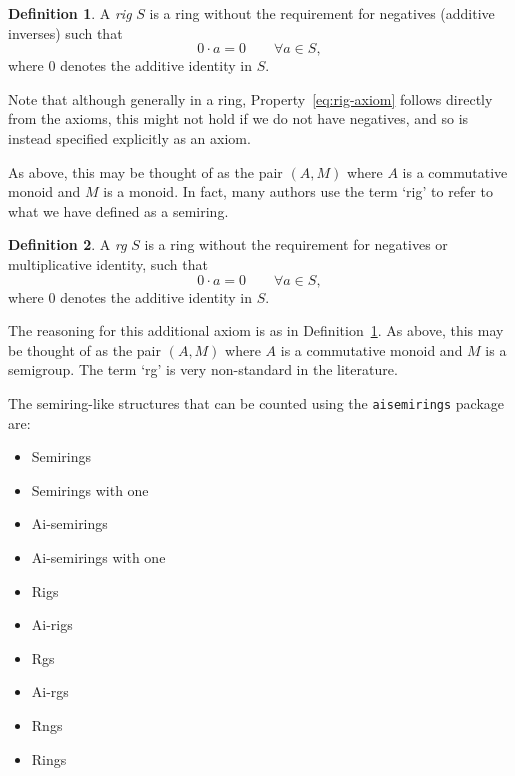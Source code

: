 \documentclass{article}
\theoremstyle{definition}
\newtheorem{definition}{Definition}
\begin{document}
\begin{definition}
    \label{def:rig}
    A \emph{rig} \(S\) is a ring without the requirement for negatives (additive inverses) such that
    \begin{equation}
        \label{eq:rig-axiom}
        0\cdot a=0\qquad\forall a\in S,
    \end{equation}
    where \(0\) denotes the additive identity in \(S\).
    
    Note that although generally in a ring, Property~\eqref{eq:rig-axiom} follows directly from the axioms, this might not hold if we do not have negatives, and so is instead specified explicitly as an axiom.

    As above, this may be thought of as the pair \((A, M)\) where \(A\) is a commutative monoid and \(M\) is a monoid. In fact, many authors use the term `rig' to refer to what we have defined as a semiring.

\end{definition}
\begin{definition}
    A \emph{rg} \(S\) is a ring without the requirement for negatives or multiplicative identity, such that    
    \begin{equation*}
        0\cdot a=0\qquad\forall a\in S,
    \end{equation*}
    where \(0\) denotes the additive identity in \(S\).
    
    The reasoning for this additional axiom is as in Definition~\ref{def:rig}. As above, this may be thought of as the pair \((A, M)\) where \(A\) is a commutative monoid and \(M\) is a semigroup. The term `rg' is very non-standard in the literature.
\end{definition}

The semiring-like structures that can be counted using the \texttt{aisemirings} package are:

\begin{multicols}{2}
\begin{itemize}
    \item Semirings
    \item Semirings with one
    \item Ai-semirings
    \item Ai-semirings with one
    \item Rigs
    \item Ai-rigs
    \item Rgs
    \item Ai-rgs
    \item Rngs
    \item Rings
\end{itemize}
\end{multicols}
\end{document}
